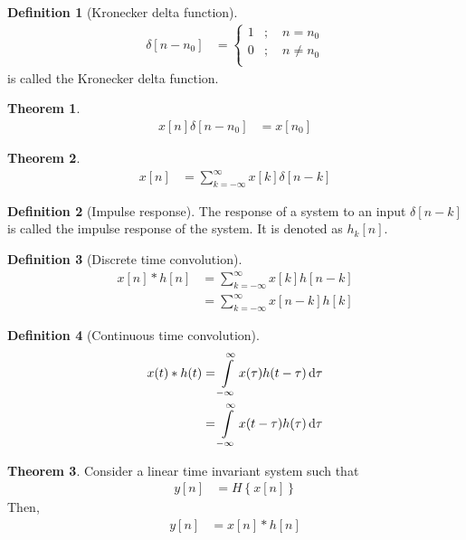 \documentclass[titlepage, fleqn, a4paper, 12pt, twoside]{article}
\theoremstyle{definition}
\newtheorem{definition}{Definition}
\theoremstyle{theorem}
\newtheorem{theorem}{Theorem}
\begin{document}
\begin{definition}[Kronecker delta function]
	\begin{align*}
		\delta[n - n_0] &=
			\begin{cases}
				1 & ;\quad n = n_0    \\
				0 & ;\quad n \neq n_0 \\
			\end{cases}
	\end{align*}
	is called the Kronecker delta function.
\end{definition}

\begin{theorem}
	\begin{align*}
		x[n] \delta[n - n_0] & = x[n_0]
	\end{align*}
\end{theorem}

\begin{theorem}
	\begin{align*}
		x[n] & = \sum\limits_{k = -\infty}^{\infty} x[k] \delta[n - k]
	\end{align*}
\end{theorem}

\begin{definition}[Impulse response]
	The response of a system to an input $\delta[n - k]$ is called the impulse response of the system.
	It is denoted as $h_k[n]$.
\end{definition}

\begin{definition}[Discrete time convolution]
	\begin{align*}
		x[n] \ast h[n] & = \sum\limits_{k = -\infty}^{\infty} x[k] h[n - k] \\
                               & = \sum\limits_{k = -\infty}^{\infty} x[n - k] h[k]
	\end{align*}
\end{definition}

\begin{definition}[Continuous time convolution]
	\begin{align*}
		x(t) \ast h(t) & = \int\limits_{-\infty}^{\infty} x(\tau) h(t - \tau) \dif \tau \\
                               & = \int\limits_{-\infty}^{\infty} x(t - \tau) h(\tau) \dif \tau
	\end{align*}
\end{definition}

\begin{theorem}
	Consider a linear time invariant system such that
	\begin{align*}
		y[n] & = H\left\{ x[n] \right\}
	\end{align*}
	Then,
	\begin{align*}
		y[n] & = x[n] \ast h[n]
	\end{align*}
\end{theorem}
\end{document}
